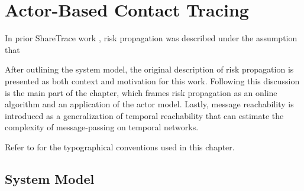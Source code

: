 \chapter{Actor-Based Contact Tracing}

In prior ShareTrace work \cite{Ayday2021}, risk propagation was described under the assumption that 

After outlining the system model, the original description of risk propagation is presented as both context and motivation for this work. Following this discussion is the main part of the chapter, which frames risk propagation as an online algorithm and an application of the actor model. Lastly, message reachability is introduced as a generalization of temporal reachability that can estimate the complexity of message-passing on temporal networks. 

Refer to  for the typographical conventions used in this chapter.

\section{System Model}

